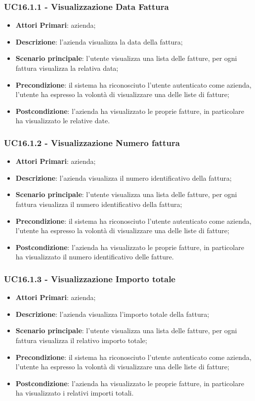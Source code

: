 \subsubsection{UC16.1.1 - Visualizzazione Data Fattura}
\begin{itemize}
	\item \textbf{Attori Primari}: azienda;
	\item \textbf{Descrizione}: l'azienda visualizza la data della fattura;
	\item \textbf{Scenario principale}: l'utente visualizza una lista delle fatture, per ogni fattura visualizza la relativa data;
	\item \textbf{Precondizione}: il sistema ha riconosciuto l'utente autenticato come azienda, l'utente ha espresso la volontà di visualizzare una delle liste di fatture;
	\item \textbf{Postcondizione}: l'azienda ha visualizzato le proprie fatture, in particolare ha visualizzato le relative date.
\end{itemize} 
\subsubsection{UC16.1.2 - Visualizzazione Numero fattura}
\begin{itemize}
	\item \textbf{Attori Primari}: azienda;
	\item \textbf{Descrizione}: l'azienda visualizza il numero identificativo della fattura;
	\item \textbf{Scenario principale}: l'utente visualizza una lista delle fatture, per ogni fattura visualizza il numero identificativo della fattura;
	\item \textbf{Precondizione}: il sistema ha riconosciuto l'utente autenticato come azienda, l'utente ha espresso la volontà di visualizzare una delle liste di fatture;
	\item \textbf{Postcondizione}: l'azienda ha visualizzato le proprie fatture, in particolare ha visualizzato il numero identificativo delle fatture.
\end{itemize} 

\subsubsection{UC16.1.3 - Visualizzazione Importo totale}
\begin{itemize}
	\item \textbf{Attori Primari}: azienda;
	\item \textbf{Descrizione}: l'azienda visualizza l'importo totale della fattura;
	\item \textbf{Scenario principale}: l'utente visualizza una lista delle fatture, per ogni fattura visualizza il relativo importo totale;
	\item \textbf{Precondizione}: il sistema ha riconosciuto l'utente autenticato come azienda, l'utente ha espresso la volontà di visualizzare una delle liste di fatture;
	\item \textbf{Postcondizione}: l'azienda ha visualizzato le proprie fatture, in particolare ha visualizzato i relativi importi totali.
\end{itemize} 

